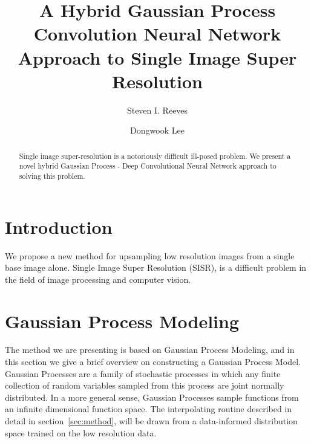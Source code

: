 \documentclass{article}%
\begin{document}
\title{A Hybrid Gaussian Process Convolution Neural Network Approach to Single Image Super Resolution}
\author{Steven I. Reeves \and Dongwook Lee}


\maketitle

\begin{abstract}
Single image super-resolution is a notoriously difficult ill-posed problem. We present a novel hybrid Gaussian Process - Deep
Convolutional Neural Network approach to solving this problem. 
\end{abstract}






\section{Introduction}
\label{sec:introduction}

We propose a new method for upsampling low resolution images from a single base image alone. Single Image Super Resolution (SISR),
is a difficult problem in the field of image processing and computer vision. 

\section{Gaussian Process Modeling}
\label{sec:GP}
The method we are presenting is based on Gaussian Process Modeling, and in this
section we give a brief overview on constructing a Gaussian Process Model. Gaussian Processes
are a family of stochastic processes in which any finite collection of random variables sampled
from this process are joint normally distributed. In a more general sense, Gaussian Processes sample functions
from an infinite dimensional function space. The interpolating routine described in detail in section~\ref{sec:method},
will be drawn from a data-informed distribution space trained on the low resolution data.
\end{document}
